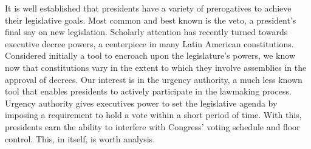 \documentclass[letter,12pt]{article}
\begin{document}






\newpage

\doublespacing

\noindent It is well established that presidents have a variety of prerogatives to achieve their legislative goals. Most common and best known is the veto, a president’s final say on new legislation. Scholarly attention has recently turned towards executive decree powers, a centerpiece in many Latin American constitutions. Considered initially a tool to encroach upon the legislature’s powers, we know now that constitutions vary in the extent to which they involve assemblies in the approval of decrees. Our interest is in the urgency authority, a much less known tool that enables presidents to actively participate in the lawmaking process. Urgency authority gives executives power to set the legislative agenda by imposing a requirement to hold a vote within a short period of time. With this, presidents earn the ability to interfere with Congress’ voting schedule and floor control. This, in itself, is worth analysis.
\end{document}
